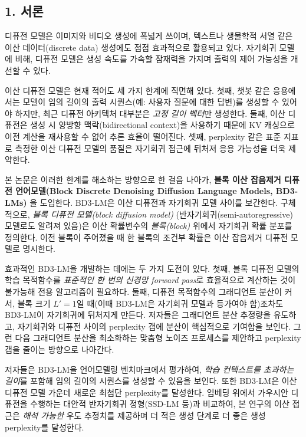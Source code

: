 \documentclass[
]{article}
\begin{document}
\hypertarget{uxc11cuxb860}{%
\subsection{1. 서론}\label{uxc11cuxb860}}

디퓨전 모델은 이미지와 비디오 생성에 폭넓게 쓰이며, 텍스트나 생물학적
서열 같은 이산 데이터(discrete data) 생성에도 점점 효과적으로 활용되고
있다. 자기회귀 모델에 비해, 디퓨전 모델은 생성 속도를 가속할 잠재력을
가지며 출력의 제어 가능성을 개선할 수 있다.

이산 디퓨전 모델은 현재 적어도 세 가지 한계에 직면해 있다. 첫째, 챗봇
같은 응용에서는 모델이 임의 길이의 출력 시퀀스(예: 사용자 질문에 대한
답변)를 생성할 수 있어야 하지만, 최근 디퓨전 아키텍처 대부분은
\emph{고정 길이 벡터}만 생성한다. 둘째, 이산 디퓨전은 생성 시 양방향
맥락(bidirectional context)을 사용하기 때문에 KV 캐싱으로 이전 계산을
재사용할 수 없어 추론 효율이 떨어진다. 셋째, perplexity 같은 표준 지표로
측정한 이산 디퓨전 모델의 품질은 자기회귀 접근에 뒤처져 응용 가능성을
더욱 제약한다.

본 논문은 이러한 한계를 해소하는 방향으로 한 걸음 나아가, \textbf{블록
이산 잡음제거 디퓨전 언어모델(Block Discrete Denoising Diffusion
Language Models, BD3-LMs)} 을 도입한다. BD3-LM은 이산 디퓨전과 자기회귀
모델 사이를 보간한다. 구체적으로, \emph{블록 디퓨전 모델(block diffusion
model)} (반자기회귀(semi-autoregressive) 모델로도 알려져 있음)은 이산
확률변수의 \emph{블록(block)} 위에서 자기회귀 확률 분포를 정의한다. 이전
블록이 주어졌을 때 한 블록의 조건부 확률은 이산 잡음제거 디퓨전 모델로
명시한다.

효과적인 BD3-LM을 개발하는 데에는 두 가지 도전이 있다. 첫째, 블록 디퓨전
모델의 학습 목적함수를 \emph{표준적인 한 번의 신경망 forward pass}로
효율적으로 계산하는 것이 불가능해 전용 알고리즘이 필요하다. 둘째, 디퓨전
목적함수의 그래디언트 분산이 커서, 블록 크기 \(L'=1\)일 때(이때 BD3-LM은
자기회귀 모델과 등가여야 함)조차도 BD3-LM이 자기회귀에 뒤처지게 만든다.
저자들은 그래디언트 분산 추정량을 유도하고, 자기회귀와 디퓨전 사이의
perplexity 갭에 분산이 핵심적으로 기여함을 보인다. 그런 다음 그래디언트
분산을 최소화하는 맞춤형 노이즈 프로세스를 제안하고 perplexity 갭을
줄이는 방향으로 나아간다.

저자들은 BD3-LM을 언어모델링 벤치마크에서 평가하여, \emph{학습
컨텍스트를 초과하는 길이}를 포함해 임의 길이의 시퀀스를 생성할 수 있음을
보인다. 또한 BD3-LM은 이산 디퓨전 모델 가운데 새로운 최첨단 perplexity를
달성한다. 임베딩 위에서 가우시안 디퓨전을 수행하는 대안적 반자기회귀
정형(SSD-LM 등)과 비교하여, 본 연구의 이산 접근은 \emph{해석 가능한}
우도 추정치를 제공하며 더 적은 생성 단계로 더 좋은 생성 perplexity를
달성한다.
\end{document}
